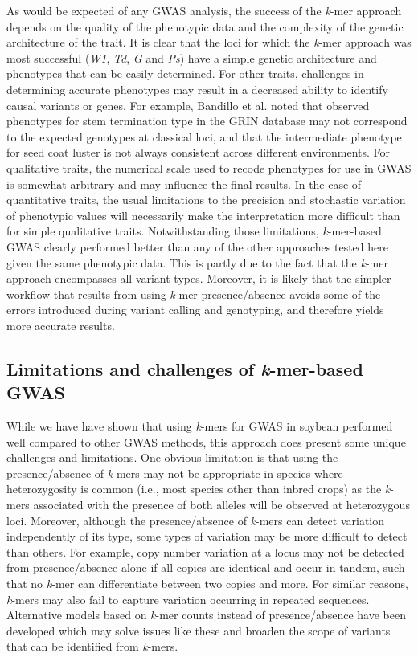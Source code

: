 \documentclass[doublespacing]{bmcart}
\begin{document}
As would be expected of any GWAS analysis, the success of the \emph{k}-mer approach
depends on the quality of the phenotypic data and the complexity of the genetic
architecture of the trait. It is clear that the loci for which the
\emph{k}-mer approach was most successful (\emph{W1}, \emph{Td}, \emph{G} and
\emph{Ps}) have a simple genetic architecture and phenotypes that can be easily
determined. For other traits, challenges in determining accurate phenotypes may
result in a decreased ability to identify causal variants or genes. For
example, Bandillo et al. \cite{bandillo2017} noted that observed phenotypes for stem
termination type in the GRIN database may not correspond to the expected
genotypes at classical loci, and that the intermediate phenotype for seed coat
luster is not always consistent across different environments. For qualitative
traits, the numerical scale used to recode phenotypes for use in GWAS is somewhat
arbitrary and may influence the final results. In the case of quantitative
traits, the usual limitations to the precision and stochastic variation of
phenotypic values will necessarily make the interpretation more difficult than
for simple qualitative traits. Notwithstanding those limitations,
\textit{k}-mer-based GWAS clearly performed better than any of the other
approaches tested here given the same phenotypic data. This is partly due
to the fact that the \textit{k}-mer approach encompasses all variant types.
Moreover, it is likely that the simpler workflow that results from using
\textit{k}-mer presence/absence avoids some of the errors introduced during
variant calling and genotyping, and therefore yields more accurate results.

\subsection*{Limitations and challenges of \emph{k}-mer-based GWAS}

While we have have shown that using \emph{k}-mers for GWAS in soybean performed
well compared to other GWAS methods, this approach does present some unique
challenges and limitations. One obvious limitation is that using the
presence/absence of \emph{k}-mers may not be appropriate in species where
heterozygosity is common (i.e., most species other than inbred crops) as the
\emph{k}-mers associated with the presence of both alleles will be observed at
heterozygous loci. Moreover, although the presence/absence of \emph{k}-mers can
detect variation independently of its type, some types of variation may be more
difficult to detect than others.  For example, copy number variation at a locus
may not be detected from presence/absence alone if all copies are identical and
occur in tandem, such that no \textit{k}-mer can differentiate between two
copies and more. For similar reasons, \emph{k}-mers may also fail to capture
variation occurring in repeated sequences. Alternative models based on
\emph{k}-mer counts instead of presence/absence have been developed
\citep{rahman2018, he2021} which may solve issues like these and broaden the
scope of variants that can be identified from \emph{k}-mers.
\end{document}

